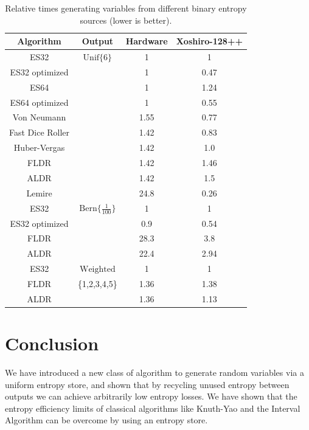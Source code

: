 \documentclass[lettersize,onecolumn]{IEEEtran}
\newcommand{\unif}[1]{\mathrm{Unif}\{#1\}}
\newcommand{\bern}[1]{\mathrm{Bern}\{#1\}}
\begin{document}
\begin{table}[h!]
\centering
\begin{tabular}{|c|c|c|c|}
\hline
Algorithm & Output & Hardware & Xoshiro-128++ \\
\hline
ES32                  & $\unif{6}$ & 1 & 1 \\
ES32 optimized        &  & 1 & 0.47 \\
ES64                  & & 1 & 1.24 \\
ES64 optimized        &  & 1 & 0.55 \\
Von Neumann \cite{neumann51}     &  & 1.55 & 0.77 \\
Fast Dice Roller \cite{lumbroso2013optimal} &  & 1.42 & 0.83 \\
Huber-Vergas \cite{huber2024optimalrollingfairdice} &  & 1.42 & 1.0 \\
FLDR \cite{saad2020fldr} &  & 1.42 & 1.46 \\
ALDR \cite{saad2025} &  & 1.42 & 1.5 \\
Lemire \cite{lemire2019fast} & & 24.8 & 0.26 \\
\hline

ES32                  & $\bern{\frac{1}{100}}$ & 1 & 1 \\
ES32 optimized        &  & 0.9 & 0.54 \\
FLDR                  &  & 28.3 & 3.8 \\
ALDR                  &  & 22.4 & 2.94 \\

\hline

ES32                  & $\mathrm{Weighted}$ & 1 & 1 \\
FLDR                  & \{1,2,3,4,5\} & 1.36 & 1.38 \\
ALDR                  & & 1.36 & 1.13 \\

\hline

\end{tabular}
\caption{Relative times generating variables from different binary entropy sources (lower is better).}
    \label{tab:speed}
\end{table}



\section{Conclusion}

We have introduced a new class of algorithm to generate random variables via a uniform entropy store, and shown that by recycling unused entropy between outputs we can achieve arbitrarily low entropy losses. We have shown that the entropy efficiency limits of classical algorithms like Knuth-Yao \cite{Knuth1976TheCO} and the Interval Algorithm \cite{han97} can be overcome by using an entropy store. 
\end{document}
